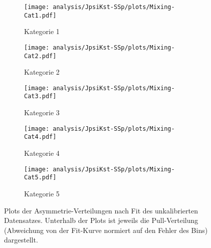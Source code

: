 \begin{figure}
        \centering
        \begin{subfigure}[b]{0.49\textwidth}
                \centering
                \texttt{[image: analysis/JpsiKst-SSp/plots/Mixing-Cat1.pdf]}
                \caption{Kategorie 1}
        \end{subfigure}
        \begin{subfigure}[b]{0.49\textwidth}
                \centering
                \texttt{[image: analysis/JpsiKst-SSp/plots/Mixing-Cat2.pdf]}
                \caption{Kategorie 2}
        \end{subfigure}

        \begin{subfigure}[b]{0.49\textwidth}
                \centering
                \texttt{[image: analysis/JpsiKst-SSp/plots/Mixing-Cat3.pdf]}
                \caption{Kategorie 3}
        \end{subfigure}
        \begin{subfigure}[b]{0.49\textwidth}
                \centering
                \texttt{[image: analysis/JpsiKst-SSp/plots/Mixing-Cat4.pdf]}
                \caption{Kategorie 4}
        \end{subfigure}

        \begin{subfigure}[b]{0.49\textwidth}
                \centering
                \texttt{[image: analysis/JpsiKst-SSp/plots/Mixing-Cat5.pdf]}
                \caption{Kategorie 5}
        \end{subfigure}
        \caption{Plots der Asymmetrie-Verteilungen nach Fit des unkalibrierten Datensatzes. Unterhalb der Plots ist jeweils die Pull-Verteilung (Abweichung von der Fit-Kurve normiert auf den Fehler des Bins) dargestellt.}
\end{figure}

